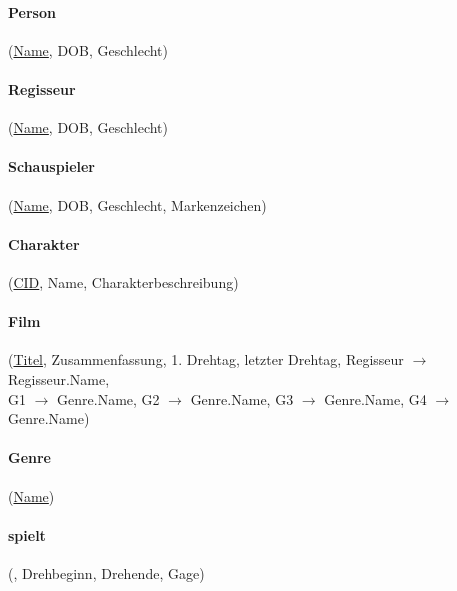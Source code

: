 \documentclass[a4paper,11pt,fleqn]{scrartcl}
\begin{document}
\begin{enumerate}
    \paragraph{Person}(\underline{Name}, DOB, Geschlecht)
    \paragraph{Regisseur}(\underline{Name}, DOB, Geschlecht)
    \paragraph{Schauspieler}(\underline{Name}, DOB, Geschlecht, Markenzeichen)
    \paragraph{Charakter}(\underline{CID}, Name, Charakterbeschreibung)
    \paragraph{Film}(\underline{Titel}, Zusammenfassung, 1. Drehtag, letzter Drehtag, Regisseur $\rightarrow$ Regisseur.Name,\\
    \phantom{Film(00} G1 $\rightarrow$ Genre.Name, G2 $\rightarrow$ Genre.Name, G3 $\rightarrow$ Genre.Name, G4 $\rightarrow$ Genre.Name)
    \paragraph{Genre}(\underline{Name})
    \paragraph{spielt}(, Drehbeginn, Drehende, Gage)\\
    

\end{enumerate}
\end{document}
